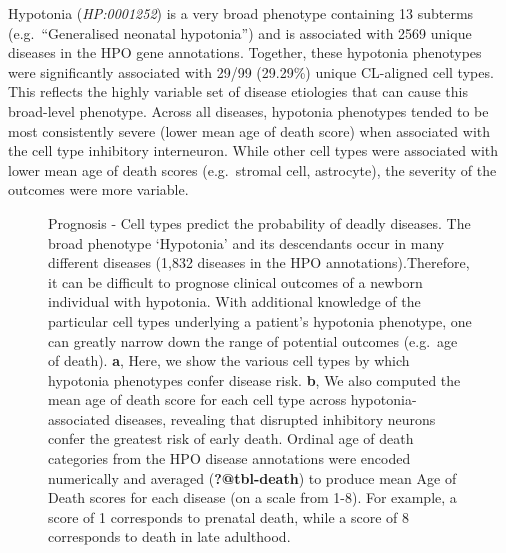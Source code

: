\documentclass[
sn-nature
]{sn-jnl}
\begin{document}
Hypotonia (\emph{HP:0001252}) is a very broad phenotype containing 13
subterms (e.g.~``Generalised neonatal hypotonia'') and is associated
with 2569 unique diseases in the HPO gene annotations. Together, these
hypotonia phenotypes were significantly associated with 29/99 (29.29\%)
unique CL-aligned cell types. This reflects the highly variable set of
disease etiologies that can cause this broad-level phenotype. Across all
diseases, hypotonia phenotypes tended to be most consistently severe
(lower mean age of death score) when associated with the cell type
inhibitory interneuron. While other cell types were associated with
lower mean age of death scores (e.g.~stromal cell, astrocyte), the
severity of the outcomes were more variable.

\label{cell-fig-prognosis}
\begin{figure}[H]


\caption{\label{fig-prognosis}Prognosis - Cell types predict the
probability of deadly diseases. The broad phenotype `Hypotonia' and its
descendants occur in many different diseases (1,832 diseases in the HPO
annotations).Therefore, it can be difficult to prognose clinical
outcomes of a newborn individual with hypotonia. With additional
knowledge of the particular cell types underlying a patient's hypotonia
phenotype, one can greatly narrow down the range of potential outcomes
(e.g.~age of death). \textbf{a}, Here, we show the various cell types by
which hypotonia phenotypes confer disease risk. \textbf{b}, We also
computed the mean age of death score for each cell type across
hypotonia-associated diseases, revealing that disrupted inhibitory
neurons confer the greatest risk of early death. Ordinal age of death
categories from the HPO disease annotations were encoded numerically and
averaged (\textbf{?@tbl-death}) to produce mean Age of Death scores for
each disease (on a scale from 1-8). For example, a score of 1
corresponds to prenatal death, while a score of 8 corresponds to death
in late adulthood.}

\end{figure}%
\end{document}
